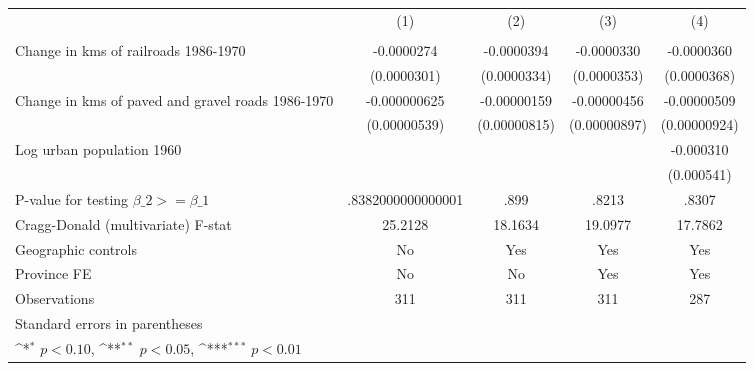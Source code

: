 {
\def\sym#1{\ifmmode^{#1}\else\(^{#1}\)\fi}
\begin{tabular}{l*{4}{c}}
\hline\hline
                &\multicolumn{1}{c}{(1)}&\multicolumn{1}{c}{(2)}&\multicolumn{1}{c}{(3)}&\multicolumn{1}{c}{(4)}\\
                &\multicolumn{1}{c}{}&\multicolumn{1}{c}{}&\multicolumn{1}{c}{}&\multicolumn{1}{c}{}\\
\hline
Change in kms of railroads 1986-1970&-0.0000274         &-0.0000394         &-0.0000330         &-0.0000360         \\
                &(0.0000301)         &(0.0000334)         &(0.0000353)         &(0.0000368)         \\
[1em]
Change in kms of paved and gravel roads 1986-1970&-0.000000625         &-0.00000159         &-0.00000456         &-0.00000509         \\
                &(0.00000539)         &(0.00000815)         &(0.00000897)         &(0.00000924)         \\
[1em]
Log urban population 1960&                  &                  &                  &-0.000310         \\
                &                  &                  &                  &(0.000541)         \\
\hline
P-value for testing $\beta\_{2} >= \beta\_{1}$&.8382000000000001         &     .899         &    .8213         &    .8307         \\
Cragg-Donald (multivariate) F-stat&  25.2128         &  18.1634         &  19.0977         &  17.7862         \\
Geographic controls&       No         &      Yes         &      Yes         &      Yes         \\
Province FE     &       No         &       No         &      Yes         &      Yes         \\
Observations    &      311         &      311         &      311         &      287         \\
\hline\hline
\multicolumn{5}{l}{\footnotesize Standard errors in parentheses}\\
\multicolumn{5}{l}{\footnotesize \sym{*} \(p<0.10\), \sym{**} \(p<0.05\), \sym{***} \(p<0.01\)}\\
\end{tabular}
}
